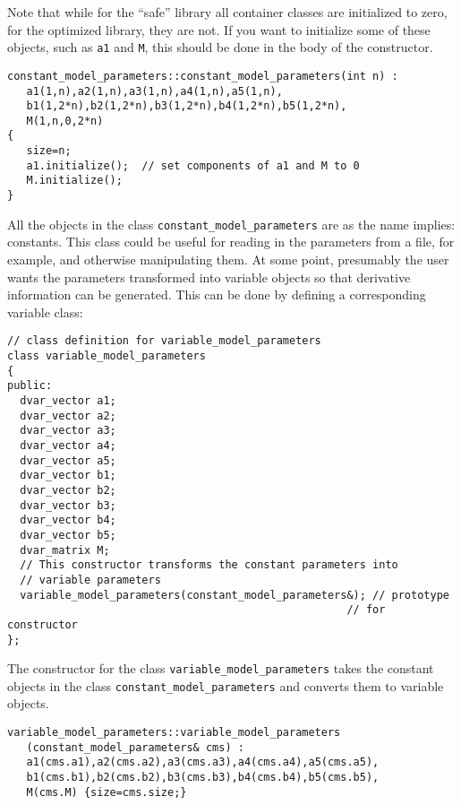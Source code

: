 \documentclass{admbmanual}
\begin{document}
Note that while for the ``safe'' library all
container classes are initialized to zero, for the optimized
library, they are not. If you want to initialize some of these
objects, such as \texttt{a1} and \texttt{M}, this should be done
in the body of the constructor.
\begin{lstlisting}
constant_model_parameters::constant_model_parameters(int n) :
   a1(1,n),a2(1,n),a3(1,n),a4(1,n),a5(1,n), 
   b1(1,2*n),b2(1,2*n),b3(1,2*n),b4(1,2*n),b5(1,2*n), 
   M(1,n,0,2*n) 
{
   size=n; 
   a1.initialize();  // set components of a1 and M to 0
   M.initialize();
}
\end{lstlisting}

All the objects in the class \texttt{constant\_model\_parameters}
are as the name implies: constants. This class could be useful for reading in 
the parameters from a file, for example, and otherwise manipulating 
them. At some point, presumably the user wants the parameters
transformed into variable objects so that derivative information
can be generated. This can be done by defining a corresponding 
variable class:

\begin{lstlisting}
// class definition for variable_model_parameters
class variable_model_parameters
{
public:
  dvar_vector a1; 
  dvar_vector a2; 
  dvar_vector a3; 
  dvar_vector a4; 
  dvar_vector a5; 
  dvar_vector b1; 
  dvar_vector b2; 
  dvar_vector b3; 
  dvar_vector b4; 
  dvar_vector b5; 
  dvar_matrix M;
  // This constructor transforms the constant parameters into 
  // variable parameters
  variable_model_parameters(constant_model_parameters&); // prototype 
                                                     // for constructor 
};
\end{lstlisting}

The constructor for the class \texttt{variable\_model\_parameters}
takes the constant objects in the class \texttt{constant\_model\_parameters} 
and converts them to variable objects.
\begin{lstlisting}
variable_model_parameters::variable_model_parameters
   (constant_model_parameters& cms) :
   a1(cms.a1),a2(cms.a2),a3(cms.a3),a4(cms.a4),a5(cms.a5), 
   b1(cms.b1),b2(cms.b2),b3(cms.b3),b4(cms.b4),b5(cms.b5), 
   M(cms.M) {size=cms.size;}
\end{lstlisting}
\end{document}
